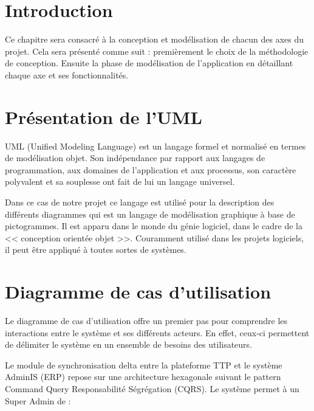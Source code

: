 \section{Introduction}

Ce chapitre sera consacré à la conception et modélisation de chacun des axes du projet. Cela sera présenté comme suit : premièrement le choix de la méthodologie de conception. Ensuite la phase de modélisation de l'application en détaillant chaque axe et ses fonctionnalités.

\section{Présentation de l'UML}

UML (Unified Modeling Language) est un langage formel et normalisé en termes de modélisation objet. Son indépendance par rapport aux langages de programmation, aux domaines de l'application et aux processus, son caractère polyvalent et sa souplesse ont fait de lui un langage universel.

Dans ce cas de notre projet ce langage est utilisé pour la description des différents diagrammes qui est un langage de modélisation graphique à base de pictogrammes. Il est apparu dans le monde du génie logiciel, dans le cadre de la << conception orientée objet >>. Couramment utilisé dans les projets logiciels, il peut être appliqué à toutes sortes de systèmes.

\section{Diagramme de cas d'utilisation}

Le diagramme de cas d'utilisation offre un premier pas pour comprendre les interactions entre le système et ses différents acteurs. En effet, ceux-ci permettent de délimiter le système en un ensemble de besoins des utilisateurs.

Le module de synchronisation delta entre la plateforme TTP et le système AdminIS (ERP) repose sur une architecture hexagonale suivant le pattern Command Query Responsabilité Ségrégation (CQRS). Le système permet à un Super Admin de :

